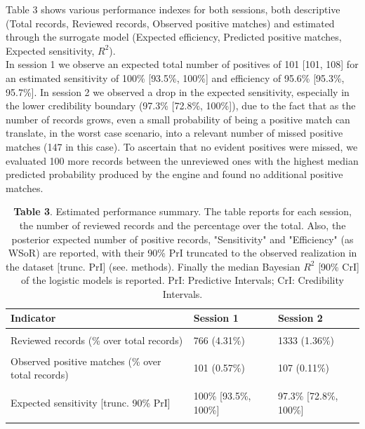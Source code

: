 \documentclass{article}
\begin{document}
Table 3 shows various performance indexes for both sessions, both
descriptive (Total records, Reviewed records, Observed positive matches)
and estimated through the surrogate model (Expected efficiency,
Predicted positive matches, Expected sensitivity, \(R^2\)).\\
In session 1 we observe an expected total number of positives of 101
{[}101, 108{]} for an estimated sensitivity of 100\% {[}93.5\%, 100\%{]}
and efficiency of 95.6\% {[}95.3\%, 95.7\%{]}. In session 2 we observed
a drop in the expected sensitivity, especially in the lower credibility
boundary (97.3\% {[}72.8\%, 100\%{]}), due to the fact that as the
number of records grows, even a small probability of being a positive
match can translate, in the worst case scenario, into a relevant number
of missed positive matches (147 in this case). To ascertain that no
evident positives were missed, we evaluated 100 more records between the
unreviewed ones with the highest median predicted probability produced
by the engine and found no additional positive matches.\\

\begin{table}[!h]

\caption{\label{tab:Table 3}\textbf{Table 3}. Estimated performance summary. The table reports for each session, the number of reviewed records and the percentage over the total. Also, the posterior expected number of positive records, "Sensitivity" and "Efficiency" (as WSoR) are reported, with their 90\% PrI truncated to the observed realization in the dataset [trunc. PrI] (see. methods). Finally the median Bayesian $R^2$ [90\% CrI] of the logistic models is reported. PrI: Predictive Intervals; CrI: Credibility Intervals.}
\centering
\begin{tabular}[t]{lll}
\toprule
Indicator & Session 1 & Session 2\\
\midrule
\cellcolor{gray!6}{Total records} & \cellcolor{gray!6}{17755} & \cellcolor{gray!6}{98371}\\
Reviewed records (\% over total records) & 766 (4.31\%) & 1333 (1.36\%)\\
\cellcolor{gray!6}{Expected efficiency (over random) [trunc. 90\% PrI]} & \cellcolor{gray!6}{95.6\% [95.3\%, 95.7\%]} & \cellcolor{gray!6}{98.6\% [98.1\%, 98.6\%]}\\
Observed positive matches (\% over total records) & 101 (0.57\%) & 107 (0.11\%)\\
\cellcolor{gray!6}{Predicted positive matches [trunc. 90\% PrI]} & \cellcolor{gray!6}{101 [101, 108]} & \cellcolor{gray!6}{110 [107, 147]}\\
\addlinespace
Expected sensitivity [trunc. 90\% PrI] & 100\% [93.5\%, 100\%] & 97.3\% [72.8\%, 100\%]\\
\cellcolor{gray!6}{Simple Model $R^2$ [90\% CrI]} & \cellcolor{gray!6}{98.1\% [97.4\%, 98.3\%]} & \cellcolor{gray!6}{98.2\% [97.6\%, 98.3\%]}\\
\bottomrule
\end{tabular}
\end{table}
\end{document}
